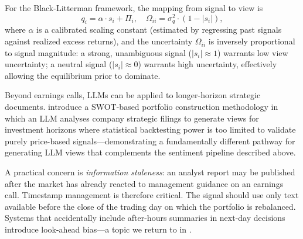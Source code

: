For the Black-Litterman framework, the mapping from signal to view is
\begin{equation}
  q_i = \alpha \cdot s_i + \Pi_i,
  \quad \Omega_{ii} = \sigma_q^2 \cdot (1 - |s_i|),
  \label{eq:ch10-signal-to-view}
\end{equation}
where $\alpha$ is a calibrated scaling constant (estimated by regressing past signals
against realized excess returns), and the uncertainty $\Omega_{ii}$ is inversely
proportional to signal magnitude: a strong, unambiguous signal ($|s_i| \approx 1$)
warrants low view uncertainty; a neutral signal ($|s_i| \approx 0$) warrants high
uncertainty, effectively allowing the equilibrium prior to dominate.

Beyond earnings calls, LLMs can be applied to longer-horizon strategic documents.
\citet{MeskovskisKenyon2024} introduce a SWOT-based portfolio construction methodology
in which an LLM analyses company strategic filings to generate views for investment
horizons where statistical backtesting power is too limited to validate purely
price-based signals---demonstrating a fundamentally different pathway for generating
LLM views that complements the sentiment pipeline described above.

A practical concern is \emph{information staleness}: an analyst report may be published
after the market has already reacted to management guidance on an earnings call.
Timestamp management is therefore critical. The signal should use only text available
before the close of the trading day on which the portfolio is rebalanced. Systems that
accidentally include after-hours summaries in next-day decisions introduce look-ahead
bias---a topic we return to in .

